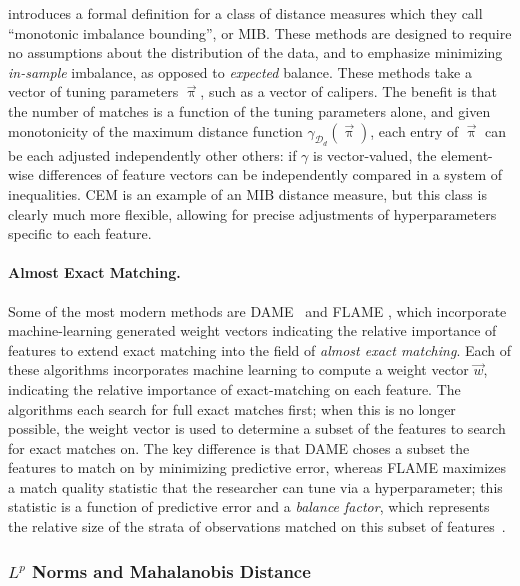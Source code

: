 \documentclass[11pt]{extarticle}
\begin{document}
\textcite{iacus_multivariate_2011} introduces a formal definition for a class of distance measures which they call ``monotonic imbalance bounding'', or MIB. These methods are designed to require no assumptions about the distribution of the data, and to emphasize minimizing \emph{in-sample} imbalance, as opposed to \emph{expected} balance. These methods take a vector of tuning parameters $\vec{\uppi}$, such as a vector of calipers. The benefit is that the number of matches is a function of the tuning parameters alone, and given monotonicity of the maximum distance function $\gamma_{\mathcal{D}_{d}}(\vec{\uppi})$, each entry of $\vec{\uppi}$ can be each adjusted independently other others: if $\gamma$ is vector-valued, the element-wise differences of feature vectors can be independently compared in a system of inequalities. CEM is an example of an MIB distance measure, but this class is clearly much more flexible, allowing for precise adjustments of hyperparameters specific to each feature.

\paragraph{Almost Exact Matching.} Some of the most modern methods are DAME~\parencite{liu_interpretable_2019} and FLAME \cite{wang_flame_2021}, which incorporate machine-learning generated weight vectors indicating the relative importance of features to extend exact matching into the field of \emph{almost exact matching}. Each of these algorithms incorporates machine learning to compute a weight vector $\vec{w}$, indicating the relative importance of exact-matching on each feature. The algorithms each search for full exact matches first; when this is no longer possible, the weight vector is used to determine a subset of the features to search for exact matches on.
The key difference is that DAME choses a subset the features to match on by minimizing predictive error, whereas FLAME maximizes a match quality statistic that the researcher can tune via a hyperparameter; this statistic is a function of predictive error and a \emph{balance factor}, which represents the relative size of the strata of observations matched on this subset of features~\parencite{gupta_dame-flame_2021}.

\subsubsection{$L^p$ Norms and Mahalanobis Distance}
\label{subsubsec:normdist}
\end{document}
